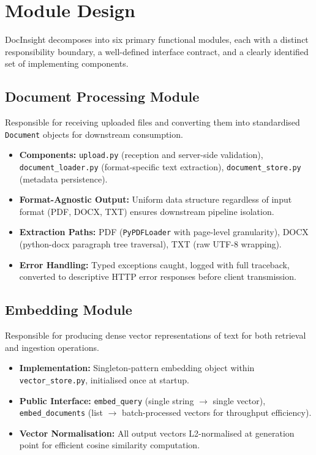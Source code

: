 \section{Module Design}

DocInsight decomposes into six primary functional modules, each with a distinct responsibility boundary, a well-defined interface contract, and a clearly identified set of implementing components.

\subsection{Document Processing Module}

Responsible for receiving uploaded files and converting them into standardised \texttt{Document} objects for downstream consumption.

\begin{itemize}
\item \textbf{Components:} \texttt{upload.py} (reception and server-side validation), \texttt{document\_loader.py} (format-specific text extraction), \texttt{document\_store.py} (metadata persistence).

\item \textbf{Format-Agnostic Output:} Uniform data structure regardless of input format (PDF, DOCX, TXT) ensures downstream pipeline isolation.

\item \textbf{Extraction Paths:} PDF (\texttt{PyPDFLoader} with page-level granularity), DOCX (python-docx paragraph tree traversal), TXT (raw UTF-8 wrapping).

\item \textbf{Error Handling:} Typed exceptions caught, logged with full traceback, converted to descriptive HTTP error responses before client transmission.
\end{itemize}

\subsection{Embedding Module}

Responsible for producing dense vector representations of text for both retrieval and ingestion operations.

\begin{itemize}
\item \textbf{Implementation:} Singleton-pattern embedding object within \texttt{vector\_store.py}, initialised once at startup.

\item \textbf{Public Interface:} \texttt{embed\_query} (single string $\rightarrow$ single vector), \texttt{embed\_documents} (list $\rightarrow$ batch-processed vectors for throughput efficiency).

\item \textbf{Vector Normalisation:} All output vectors L2-normalised at generation point for efficient cosine similarity computation.
\end{itemize}

